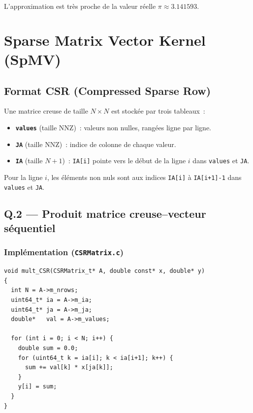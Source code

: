 \documentclass[12pt,a4paper]{article}
\begin{document}
L'approximation est très proche de la valeur réelle $\pi \approx 3.141593$.

\newpage
\section{Sparse Matrix Vector Kernel (SpMV)}

\subsection{Format CSR (Compressed Sparse Row)}

Une matrice creuse de taille $N \times N$ est stockée par trois tableaux~:
\begin{itemize}
  \item \textbf{\texttt{values}} (taille NNZ)~: valeurs non nulles, rangées ligne par ligne.
  \item \textbf{\texttt{JA}} (taille NNZ)~: indice de colonne de chaque valeur.
  \item \textbf{\texttt{IA}} (taille $N+1$)~: \texttt{IA[i]} pointe vers le début de la ligne $i$ dans \texttt{values} et \texttt{JA}.
\end{itemize}

Pour la ligne $i$, les éléments non nuls sont aux indices \texttt{IA[i]} à \texttt{IA[i+1]-1} dans \texttt{values} et \texttt{JA}.

\subsection{Q.2 --- Produit matrice creuse--vecteur séquentiel}

\subsubsection{Implémentation (\texttt{CSRMatrix.c})}

\begin{lstlisting}[style=cstyle]
void mult_CSR(CSRMatrix_t* A, double const* x, double* y)
{
  int N = A->m_nrows;
  uint64_t* ia = A->m_ia;
  uint64_t* ja = A->m_ja;
  double*   val = A->m_values;

  for (int i = 0; i < N; i++) {
    double sum = 0.0;
    for (uint64_t k = ia[i]; k < ia[i+1]; k++) {
      sum += val[k] * x[ja[k]];
    }
    y[i] = sum;
  }
}
\end{lstlisting}
\end{document}

